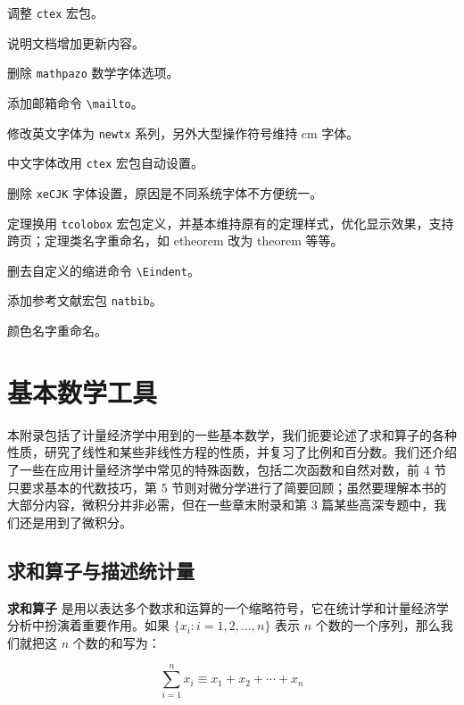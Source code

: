 \documentclass[lang=cn,10pt]{elegantbook}
\begin{document}

\begin{change}
  \item 调整 \lstinline{ctex} 宏包。
  \item 说明文档增加更新内容。
\end{change}


\begin{change}
  \item 删除 \lstinline{mathpazo} 数学字体选项。
  \item 添加邮箱命令 \lstinline{\mailto}。
  \item 修改英文字体为 \lstinline{newtx} 系列，另外大型操作符号维持 cm 字体。
  \item 中文字体改用 \lstinline{ctex} 宏包自动设置。
  \item 删除 \lstinline{xeCJK} 字体设置，原因是不同系统字体不方便统一。
  \item 定理换用 \lstinline{tcolobox} 宏包定义，并基本维持原有的定理样式，优化显示效果，支持跨页；定理类名字重命名，如 etheorem 改为 theorem 等等。
  \item 删去自定义的缩进命令 \lstinline{\Eindent}。
  \item 添加参考文献宏包 \lstinline{natbib}。
  \item 颜色名字重命名。
\end{change}

\nocite{*}
\printbibliography[heading=bibintoc, title=\ebibname]
\appendix

\chapter{基本数学工具}


本附录包括了计量经济学中用到的一些基本数学，我们扼要论述了求和算子的各种性质，研究了线性和某些非线性方程的性质，并复习了比例和百分数。我们还介绍了一些在应用计量经济学中常见的特殊函数，包括二次函数和自然对数，前 4 节只要求基本的代数技巧，第 5 节则对微分学进行了简要回顾；虽然要理解本书的大部分内容，微积分并非必需，但在一些章末附录和第 3 篇某些高深专题中，我们还是用到了微积分。

\section{求和算子与描述统计量}

\textbf{求和算子} 是用以表达多个数求和运算的一个缩略符号，它在统计学和计量经济学分析中扮演着重要作用。如果 $\{x_i: i=1, 2, \ldots, n\}$ 表示 $n$ 个数的一个序列，那么我们就把这 $n$ 个数的和写为：

\begin{equation}
\sum_{i=1}^n x_i \equiv x_1 + x_2 +\cdots + x_n
\end{equation}
\end{document}
